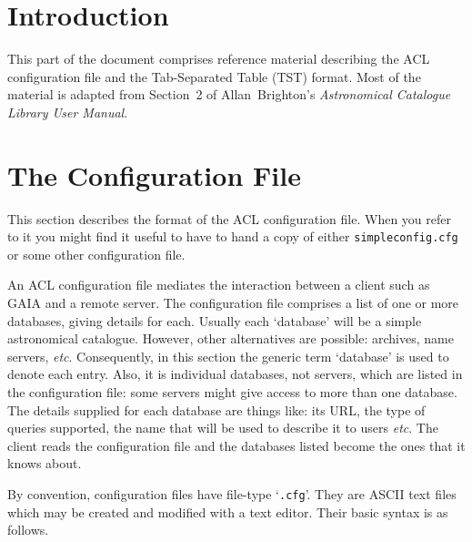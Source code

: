 \documentclass[twoside,11pt]{article}
\newcommand{\xref}[3]{#1}
\newcommand{\xlabel}[1]{}
\renewcommand{\_}{\texttt{\symbol{95}}}
\begin{document}
\section{\xlabel{INTRO_R}\label{INTRO_R}Introduction}

This part of the document comprises reference material describing
the ACL configuration file and the Tab-Separated Table (TST) format.
Most of the material is adapted from Section~2 of Allan~Brighton's {\it
Astronomical Catalogue Library User Manual}\/\cite{BRIGHTON98}.


\section{\xlabel{CONFIG_R}\label{CONFIG_R}The Configuration File}

This section describes the format of the ACL configuration file.  When
you refer to it you might find it useful to have to hand a copy of
either {\tt simpleconfig.cfg} or some other configuration file.

An ACL configuration file mediates the interaction between
a client such as \xref{GAIA}{sun214}{} and a remote server.
The configuration file comprises a list of one or more databases,
giving details for each.  Usually each `database' will be a simple
astronomical catalogue.  However, other alternatives are possible:
archives, name servers, \emph{etc}.  Consequently, in this section the
generic term `database' is used to denote each entry.  Also, it is
individual databases, not servers, which are listed in the configuration
file: some servers might give access to more than one database.
The details supplied for each database are things like: its URL, the
type of queries supported, the name that will be used to describe it to
users \emph{etc}.  The client reads the configuration file and the
databases listed become the ones that it knows about.

By convention, configuration files have file-type `{\tt .cfg}'.
They are ASCII text files which may be created and modified with a text
editor.  Their basic syntax is as follows.
\end{document}
